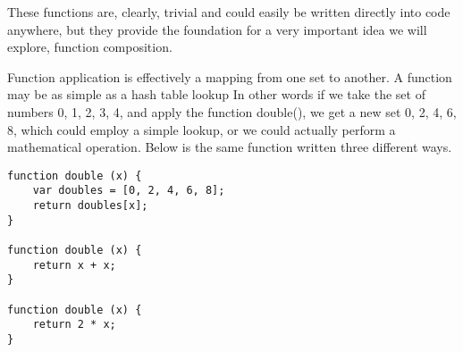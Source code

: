 \documentclass[a4paper,12pt,twoside]{book}
\begin{document}
 These functions are, clearly, trivial and could easily be written directly into code anywhere, but they provide the foundation for a very important idea we will explore, function composition.
 
 Function application is effectively a mapping from one set to another. A function may be as simple as a hash table lookup In other words if we take the set of numbers {0, 1, 2, 3, 4}, and apply the function double(), we get a new set {0, 2, 4, 6, 8}, which could employ a simple lookup, or we could actually perform a mathematical operation.  Below is the same function written three different ways.
 
\begin{lstlisting}
function double (x) {
    var doubles = [0, 2, 4, 6, 8];
    return doubles[x];
}

function double (x) {
    return x + x;
}

function double (x) {
    return 2 * x;
}
\end{lstlisting}
\end{document}
